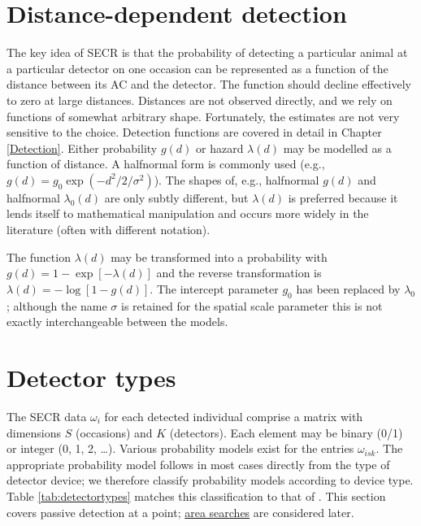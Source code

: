 \documentclass[
]{book}
\begin{document}
\section{Distance-dependent detection}\label{distance-dependent-detection-1}

The key idea of SECR is that the probability of detecting a particular animal at a particular detector on one occasion can be represented as a function of the distance between its AC and the detector. The function should decline effectively to zero at large distances. Distances are not observed directly, and we rely on functions of somewhat arbitrary shape. Fortunately, the estimates are not very sensitive to the choice. Detection functions are covered in detail in Chapter \ref{Detection}. Either probability \(g(d)\) or hazard \(\lambda(d)\) may be modelled as a function of distance. A halfnormal form is commonly used (e.g., \(g(d) = g_0 \exp (-d^2/2/\sigma^2)\)). The shapes of, e.g., halfnormal \(g(d)\) and halfnormal \(\lambda_0(d)\) are only subtly different, but \(\lambda(d)\) is preferred because it lends itself to mathematical manipulation and occurs more widely in the literature (often with different notation).

The function \(\lambda(d)\) may be transformed into a probability with \(g(d) = 1 - \exp[-\lambda(d)]\) and the reverse transformation is \(\lambda(d) = -\log[1-g(d)]\). The intercept parameter \(g_0\) has been replaced by \(\lambda_0\); although the name \(\sigma\) is retained for the spatial scale parameter this is not exactly interchangeable between the models.

\section{Detector types}\label{pointdetectors}


The SECR data \(\omega_i\) for each detected individual comprise a matrix with dimensions \(S\) (occasions) and \(K\) (detectors). Each element may be binary (0/1) or integer (0, 1, 2, \ldots). Various probability models exist for the entries \(\omega_{isk}\). The appropriate probability model follows in most cases directly from the type of detector device; we therefore classify probability models according to device type. Table \ref{tab:detectortypes} matches this classification to that of \citet{rcsg14}. This section covers passive detection at a point; \hyperref[areasearches]{area searches} are considered later.
\end{document}
